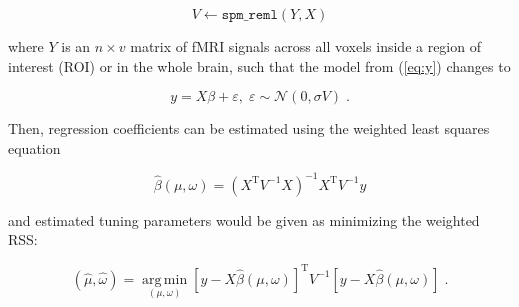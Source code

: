 \documentclass[a4paper,12pt]{article}
\begin{document}
\begin{equation} \label{eq:ReML}
V \leftarrow \mathtt{spm\_reml}(Y, X)
\end{equation}

where $Y$ is an $n \times v$ matrix of fMRI signals across all voxels inside a region of interest (ROI) or in the whole brain, such that the model from (\ref{eq:y}) changes to

\begin{equation} \label{eq:y-X-V}
y = X \beta + \varepsilon, \; \varepsilon \sim \mathcal{N}(0, \sigma V) \; .
\end{equation}

Then, regression coefficients can be estimated using the weighted least squares equation

\begin{equation} \label{eq:b-est-X-V}
\hat{\beta}(\mu,\omega) = (X^\mathrm{T} V^{-1} X)^{-1} X^\mathrm{T} V^{-1} y
\end{equation}

and estimated tuning parameters would be given as minimizing the weighted RSS:

\begin{equation} \label{eq:mu-tw-est-X-V}
(\hat{\mu},\hat{\omega}) = \operatorname*{arg\,min}_{(\mu,\omega)} \left[ y - X \hat{\beta}(\mu,\omega) \right]^\mathrm{T} V^{-1} \left[ y - X \hat{\beta}(\mu,\omega) \right] \; .
\end{equation}
\end{document}
